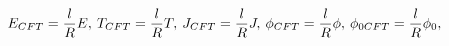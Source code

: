 \begin{equation}
E_{CFT}=\frac{l}{R}E,\hspace{0.07 cm}T_{CFT}=\frac{l}{R}T
,\hspace{0.07 cm}J_{CFT}=\frac{l}{R}J,\hspace{0.07
cm}\phi_{CFT}=\frac{l}{R}\phi,\hspace{0.07
cm}\phi_{0CFT}=\frac{l}{R}\phi_{0}, \label{CFT}
\end{equation}

